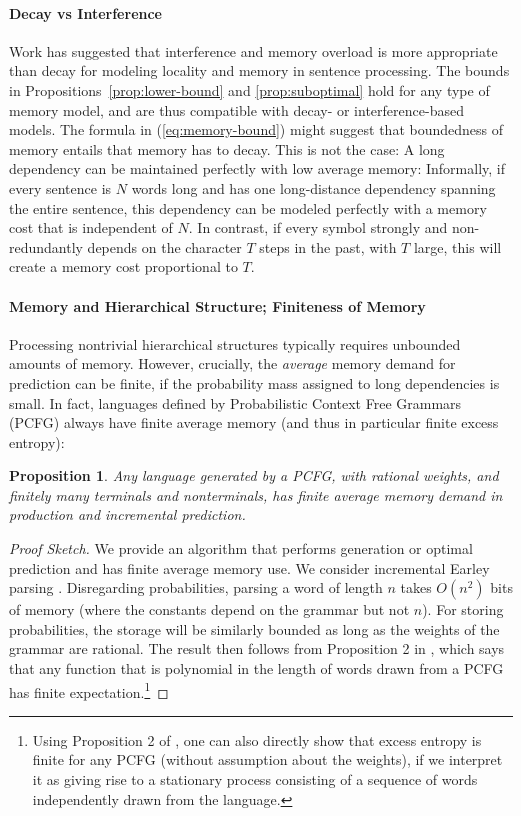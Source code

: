 \documentclass[11pt,letterpaper]{article}
\newcounter{theorem}
\newtheorem{proposition}[theorem]{Proposition}
\begin{document}
\paragraph{Decay vs Interference}
Work has suggested that interference and memory overload is more appropriate than decay \cite[p. 408]{lewis-activation-based-2005} for modeling locality and memory in sentence processing.
The bounds in Propositions~\ref{prop:lower-bound} and \ref{prop:suboptimal} hold for any type of memory model, and are thus compatible with decay- or interference-based models.
The formula in (\ref{eq:memory-bound}) might suggest that boundedness of memory entails that memory has to decay.
This is not the case:
A long dependency can be maintained perfectly with low average memory:
Informally, if every sentence is $N$ words long and has one long-distance dependency spanning the entire sentence, this dependency can be modeled perfectly with a memory cost that is independent of $N$.
In contrast, if every symbol strongly and non-redundantly depends on the character $T$ steps in the past, with $T$ large, this will create a memory cost proportional to $T$.




\paragraph{Memory and Hierarchical Structure; Finiteness of Memory}
Processing nontrivial hierarchical structures typically requires unbounded amounts of memory.
However, crucially, the \emph{average} memory demand for prediction can be finite, if the probability mass assigned to long dependencies is small.
In fact, languages defined by Probabilistic Context Free Grammars (PCFG) always have finite average memory (and thus in particular finite excess entropy):


\begin{proposition}
Any language generated by a PCFG, with rational weights, and finitely many terminals and nonterminals, has finite average memory demand in production and incremental prediction.
\end{proposition}

\begin{proof}[Proof Sketch]
	We provide an algorithm that performs generation or optimal prediction and has finite average memory use. We consider incremental Earley parsing \citep{earley-efficient-1970}. Disregarding probabilities, parsing a word of length $n$ takes $O(n^2)$ bits of memory (where the constants depend on the grammar but not $n$). For storing probabilities, the storage will be similarly bounded as long as the weights of the grammar are rational.
	The result then follows from Proposition 2 in \cite{chi-statistical-1999}, which says that any function that is polynomial in the length of words drawn from a PCFG has finite expectation.\footnote{Using Proposition 2 of \cite{chi-statistical-1999}, one can also directly show that excess entropy is finite for any PCFG (without assumption about the weights), if we interpret it as giving rise to a stationary process consisting of a sequence of words independently drawn from the language.}
\end{proof}
\end{document}
